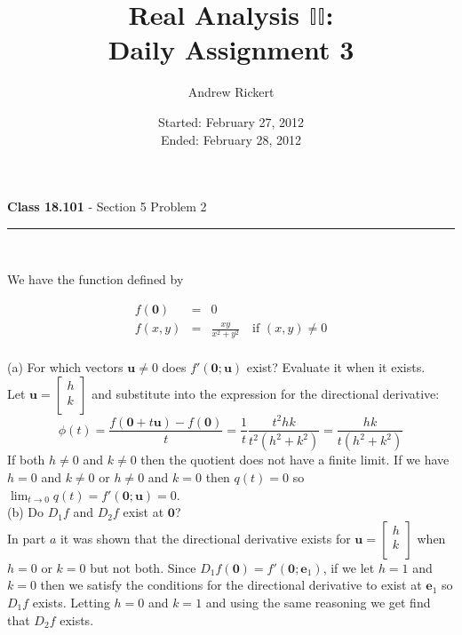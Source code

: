 \documentclass[11pt,reqno]{article}
\title{Real Analysis $\mathbb{II}$: \\ Daily Assignment 3}
\author{Andrew Rickert}
\date{Started: February 27, 2012 \\ \hspace{1pt} Ended: February 28,  2012}                                           %
\begin{document}
\maketitle


\begin{flushleft} 
\textbf{Class 18.101} - Section 5 Problem 2\\
\rule{500pt}{1pt}\\
\end{flushleft} 

\noindent We have the function defined by

\begin{eqnarray*} 
f(\textbf{0}) &=& 0 \\
f(x,y) &=& \frac{x y}{x^2 + y^2} \quad \text{if $(x,y) \neq 0$} \\
\end{eqnarray*}

\noindent (a) For which vectors $\textbf{u} \neq 0$ does $f'(\textbf{0};\textbf{u})$ exist? Evaluate it when it exists.\\

\noindent Let $\textbf{u} = \left[ \begin{array}{c} h\\ k\\ \end{array} \right]$ and substitute into the expression for the directional derivative:
\[ \phi(t) = \frac{f(\textbf{0} + t \textbf{u}) - f(\textbf{0})}{t} = \frac{1}{t} \frac{t^2 h k}{t^2 (h^2 + k^2)} = \frac{h k}{t (h^2 + k^2)} \]
If both $h \neq 0$ and $k \neq 0$ then the quotient does not have a finite limit. If we have $h = 0$ and $k \neq 0$ or $h \neq 0$ and $k = 0$ then $q(t) = 0$ so $\lim_{t \to 0} q(t) = f'(\textbf{0};\textbf{u}) = 0$.\\

\noindent (b) Do $D_1 f$ and $D_2 f$ exist at $\textbf{0}$?\\

In part $a$ it was shown that the directional derivative exists for $\textbf{u} = \left[ \begin{array}{c} h\\ k\\ \end{array} \right]$ when $h = 0$ or $k = 0$ but not both. Since $D_1 f(\textbf{0}) = f'(\textbf{0};\textbf{e}_1)$, if we let $h = 1$ and $k = 0$ then we satisfy the conditions for the directional derivative to exist at $\textbf{e}_1$ so $D_1 f$ exists. Letting $h = 0$ and $k = 1$ and using the same reasoning we get find that $D_2 f$ exists.\\
\end{document}
